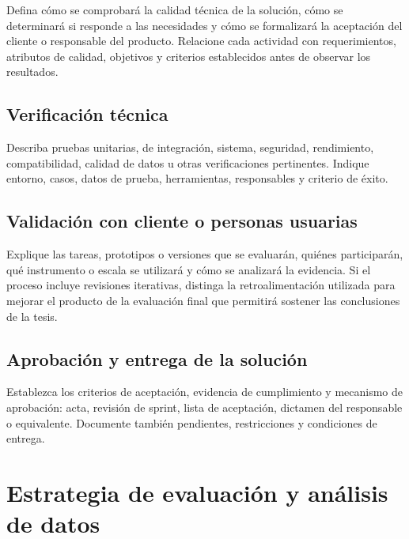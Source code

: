 Defina cómo se comprobará la calidad técnica de la solución, cómo se determinará
si responde a las necesidades y cómo se formalizará la aceptación del cliente o
responsable del producto. Relacione cada actividad con requerimientos, atributos
de calidad, objetivos y criterios establecidos antes de observar los resultados.

\subsection{Verificación técnica}

Describa pruebas unitarias, de integración, sistema, seguridad, rendimiento,
compatibilidad, calidad de datos u otras verificaciones pertinentes. Indique
entorno, casos, datos de prueba, herramientas, responsables y criterio de éxito.

\subsection{Validación con cliente o personas usuarias}

Explique las tareas, prototipos o versiones que se evaluarán, quiénes
participarán, qué instrumento o escala se utilizará y cómo se analizará la
evidencia. Si el proceso incluye revisiones iterativas, distinga la
retroalimentación utilizada para mejorar el producto de la evaluación final que
permitirá sostener las conclusiones de la tesis.

\subsection{Aprobación y entrega de la solución}

Establezca los criterios de aceptación, evidencia de cumplimiento y mecanismo
de aprobación: acta, revisión de sprint, lista de aceptación, dictamen del
responsable o equivalente. Documente también pendientes, restricciones y
condiciones de entrega.


\section{Estrategia de evaluación y análisis de datos}

